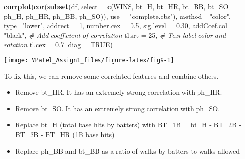\documentclass[]{article}
\newenvironment{Shaded}{\begin{snugshade}}{\end{snugshade}}
\newcommand{\CommentTok}[1]{\textcolor[rgb]{0.56,0.35,0.01}{\textit{#1}}}
\newcommand{\DataTypeTok}[1]{\textcolor[rgb]{0.13,0.29,0.53}{#1}}
\newcommand{\DecValTok}[1]{\textcolor[rgb]{0.00,0.00,0.81}{#1}}
\newcommand{\FloatTok}[1]{\textcolor[rgb]{0.00,0.00,0.81}{#1}}
\newcommand{\KeywordTok}[1]{\textcolor[rgb]{0.13,0.29,0.53}{\textbf{#1}}}
\newcommand{\NormalTok}[1]{#1}
\newcommand{\OperatorTok}[1]{\textcolor[rgb]{0.81,0.36,0.00}{\textbf{#1}}}
\newcommand{\OtherTok}[1]{\textcolor[rgb]{0.56,0.35,0.01}{#1}}
\newcommand{\StringTok}[1]{\textcolor[rgb]{0.31,0.60,0.02}{#1}}
\providecommand{\tightlist}{%
  \setlength{\itemsep}{0pt}\setlength{\parskip}{0pt}}
\begin{document}
\begin{Shaded}
\begin{Highlighting}[]
\KeywordTok{corrplot}\NormalTok{(}\KeywordTok{cor}\NormalTok{(}\KeywordTok{subset}\NormalTok{(df, }\DataTypeTok{select =} \KeywordTok{c}\NormalTok{(WINS, bt_H, bt_HR, bt_BB, bt_SO, ph_H, ph_HR, ph_BB, ph_SO)), }\DataTypeTok{use =} \StringTok{"complete.obs"}\NormalTok{), }\DataTypeTok{method =}\StringTok{"color"}\NormalTok{, }\DataTypeTok{type=}\StringTok{"lower"}\NormalTok{, }\DataTypeTok{addrect =} \DecValTok{1}\NormalTok{, }\DataTypeTok{number.cex =} \FloatTok{0.5}\NormalTok{, }\DataTypeTok{sig.level =} \FloatTok{0.30}\NormalTok{,}
         \DataTypeTok{addCoef.col =} \StringTok{"black"}\NormalTok{, }\CommentTok{# Add coefficient of correlation}
         \DataTypeTok{tl.srt =} \DecValTok{25}\NormalTok{, }\CommentTok{# Text label color and rotation}
         \DataTypeTok{tl.cex =} \FloatTok{0.7}\NormalTok{,}
         \DataTypeTok{diag =} \OtherTok{TRUE}\NormalTok{)}
\end{Highlighting}
\end{Shaded}

\begin{center}\texttt{[image: VPatel\_Assign1\_files/figure-latex/fig9-1]} \end{center}

To fix this, we can remove some correlated features and combine others.

\begin{itemize}
\tightlist
\item
  Remove bt\_HR. It has an extremely strong correlation with ph\_HR.
\item
  Remove bt\_SO. It has an extremely strong correlation with ph\_SO.
\item
  Replace bt\_H (total base hits by batters) with BT\_1B = bt\_H -
  BT\_2B - BT\_3B - BT\_HR (1B base hits)
\item
  Replace ph\_BB and bt\_BB as a ratio of walks by batters to walks
  allowed
\end{itemize}

\begin{Shaded}
\end{Shaded}
\end{document}
